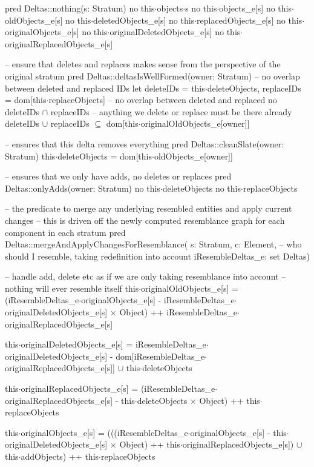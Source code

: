 pred Deltas::nothing(s: Stratum)
{
  no this$\cdot$objects$\cdot$s
  no this$\cdot$objects_e[s]
  no this$\cdot$oldObjects_e[s]
  no this$\cdot$deletedObjects_e[s]
  no this$\cdot$replacedObjects_e[s]
  no this$\cdot$originalObjects_e[s]
  no this$\cdot$originalDeletedObjects_e[s]
  no this$\cdot$originalReplacedObjects_e[s]
}

-- ensure that deletes and replaces makes sense from the perspective of the original stratum
pred Deltas::deltasIsWellFormed(owner: Stratum)
{
  -- no overlap between deleted and replaced IDs
  let
    deleteIDs = this$\cdot$deleteObjects,
    replaceIDs = dom[this$\cdot$replaceObjects]
  {
    -- no overlap between deleted and replaced
    no deleteIDs $\cap$ replaceIDs
    -- anything we delete or replace must be there already
    deleteIDs $\cup$ replaceIDs $\subseteq$ dom[this$\cdot$originalOldObjects_e[owner]]
  }
}

-- ensures that this delta removes everything
pred Deltas::cleanSlate(owner: Stratum)
{
  this$\cdot$deleteObjects = dom[this$\cdot$oldObjects_e[owner]]
}

-- ensures that we only have adds, no deletes or replaces
pred Deltas::onlyAdds(owner: Stratum)
{
  no this$\cdot$deleteObjects
  no this$\cdot$replaceObjects
}


-- the predicate to merge any underlying resembled entities and apply current changes
-- this is driven off the newly computed resemblance graph for each component in each stratum
pred Deltas::mergeAndApplyChangesForResemblance(
  s: Stratum,
  c: Element,
  -- who should I resemble, taking redefinition into account
  iResembleDeltas_e: set Deltas)
{
  -- handle add, delete etc as if we are only taking resemblance into account
  -- nothing will ever resemble itself
  this$\cdot$originalOldObjects_e[s] =
    (iResembleDeltas_e$\cdot$originalObjects_e[s]
      - iResembleDeltas_e$\cdot$originalDeletedObjects_e[s]$\,\times\,$Object)
        ++ iResembleDeltas_e$\cdot$originalReplacedObjects_e[s]
        
  this$\cdot$originalDeletedObjects_e[s] =
    iResembleDeltas_e$\cdot$originalDeletedObjects_e[s]
      - dom[iResembleDeltas_e$\cdot$originalReplacedObjects_e[s]] $\cup$ this$\cdot$deleteObjects
    
  this$\cdot$originalReplacedObjects_e[s] =
    (iResembleDeltas_e$\cdot$originalReplacedObjects_e[s] - this$\cdot$deleteObjects$\,\times\,$Object)
      ++ this$\cdot$replaceObjects
      
  this$\cdot$originalObjects_e[s] = 
    (((iResembleDeltas_e$\cdot$originalObjects_e[s] - this$\cdot$originalDeletedObjects_e[s]$\,\times\,$Object)
        ++ this$\cdot$originalReplacedObjects_e[s]) $\cup$ this$\cdot$addObjects)
          ++ this$\cdot$replaceObjects  
}

